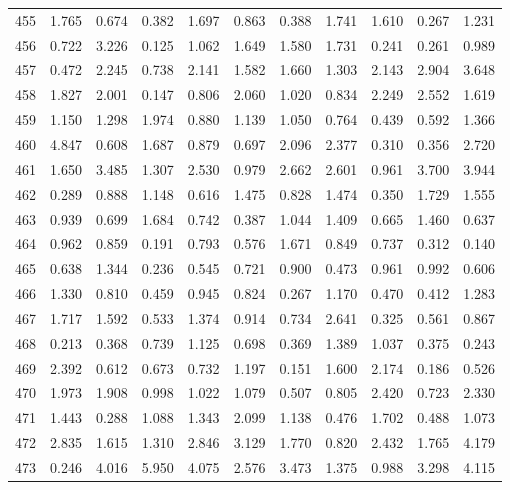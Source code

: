 \begin{tabular}{lrrrrrrrrrr}
455 &  1.765 &  0.674 &  0.382 &  1.697 &  0.863 &  0.388 &  1.741 &  1.610 &  0.267 &  1.231 \\
456 &  0.722 &  3.226 &  0.125 &  1.062 &  1.649 &  1.580 &  1.731 &  0.241 &  0.261 &  0.989 \\
457 &  0.472 &  2.245 &  0.738 &  2.141 &  1.582 &  1.660 &  1.303 &  2.143 &  2.904 &  3.648 \\
458 &  1.827 &  2.001 &  0.147 &  0.806 &  2.060 &  1.020 &  0.834 &  2.249 &  2.552 &  1.619 \\
459 &  1.150 &  1.298 &  1.974 &  0.880 &  1.139 &  1.050 &  0.764 &  0.439 &  0.592 &  1.366 \\
460 &  4.847 &  0.608 &  1.687 &  0.879 &  0.697 &  2.096 &  2.377 &  0.310 &  0.356 &  2.720 \\
461 &  1.650 &  3.485 &  1.307 &  2.530 &  0.979 &  2.662 &  2.601 &  0.961 &  3.700 &  3.944 \\
462 &  0.289 &  0.888 &  1.148 &  0.616 &  1.475 &  0.828 &  1.474 &  0.350 &  1.729 &  1.555 \\
463 &  0.939 &  0.699 &  1.684 &  0.742 &  0.387 &  1.044 &  1.409 &  0.665 &  1.460 &  0.637 \\
464 &  0.962 &  0.859 &  0.191 &  0.793 &  0.576 &  1.671 &  0.849 &  0.737 &  0.312 &  0.140 \\
465 &  0.638 &  1.344 &  0.236 &  0.545 &  0.721 &  0.900 &  0.473 &  0.961 &  0.992 &  0.606 \\
466 &  1.330 &  0.810 &  0.459 &  0.945 &  0.824 &  0.267 &  1.170 &  0.470 &  0.412 &  1.283 \\
467 &  1.717 &  1.592 &  0.533 &  1.374 &  0.914 &  0.734 &  2.641 &  0.325 &  0.561 &  0.867 \\
468 &  0.213 &  0.368 &  0.739 &  1.125 &  0.698 &  0.369 &  1.389 &  1.037 &  0.375 &  0.243 \\
469 &  2.392 &  0.612 &  0.673 &  0.732 &  1.197 &  0.151 &  1.600 &  2.174 &  0.186 &  0.526 \\
470 &  1.973 &  1.908 &  0.998 &  1.022 &  1.079 &  0.507 &  0.805 &  2.420 &  0.723 &  2.330 \\
471 &  1.443 &  0.288 &  1.088 &  1.343 &  2.099 &  1.138 &  0.476 &  1.702 &  0.488 &  1.073 \\
472 &  2.835 &  1.615 &  1.310 &  2.846 &  3.129 &  1.770 &  0.820 &  2.432 &  1.765 &  4.179 \\
473 &  0.246 &  4.016 &  5.950 &  4.075 &  2.576 &  3.473 &  1.375 &  0.988 &  3.298 &  4.115 \\

\end{tabular}
